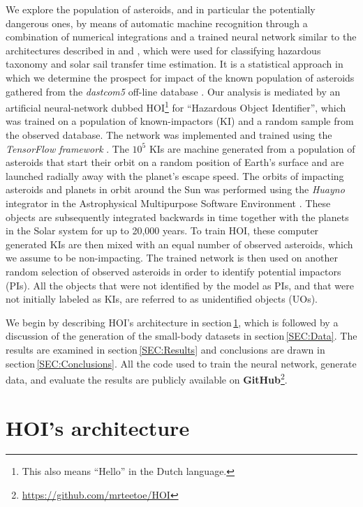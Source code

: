 \documentclass{aa}
\begin{document}
We explore the population of asteroids, and in particular the
potentially dangerous ones, by means of automatic machine recognition
through a combination of numerical integrations and a trained neural
network similar to the architectures described in \citep{ref1} and
\citep{ref2}, which were used for classifying hazardous taxonomy and
solar sail transfer time estimation. It is a statistical approach in
which we determine the prospect for impact of the known population of
asteroids gathered from the \textit{dastcom5} off-line database
\citep{dastcom5}.  Our analysis is mediated by an artificial
neural-network dubbed HOI\footnote{This also means ``Hello'' in the
  Dutch language.} for ``Hazardous Object Identifier'', which was
trained on a population of known-impactors (KI) and a random sample
from the observed database.  The network was implemented and trained
using the \textit{TensorFlow framework} \citep{TensorFlow}. The $10^5$
KIs are machine generated from a population of asteroids that start
their orbit on a random position of Earth's surface and are launched
radially away with the planet's escape speed. The orbits of impacting
asteroids and planets in orbit around the Sun was performed using the
\textit{Huayno} integrator \cite{2014A&A...570A..20J} in the
Astrophysical Multipurpose Software Environment
\cite{2018araa.book.....P}.  These objects are subsequently integrated
backwards in time together with the planets in the Solar system for up
to 20,000 years. To train HOI, these computer generated KIs are then
mixed with an equal number of observed asteroids, which we assume to
be non-impacting.  The trained network is then used on another random
selection of observed asteroids in order to identify potential
impactors (PIs). All the objects that were not identified by the model
as PIs, and that were not initially labeled as KIs, are referred to as
unidentified objects (UOs).

We begin by describing HOI's architecture in
section\,\ref{SEC:1D_CNN}, which is followed by a discussion of the
generation of the small-body datasets in section\,\ref{SEC:Data}. The
results are examined in section\,\ref{SEC:Results} and conclusions are
drawn in section\,\ref{SEC:Conclusions}. All the code used to train
the neural network, generate data, and evaluate the results are
publicly available on \textbf{GitHub}\footnote{
  \url{https://github.com/mrteetoe/HOI}}.

\section{HOI's architecture}
\label{SEC:1D_CNN}
\end{document}
